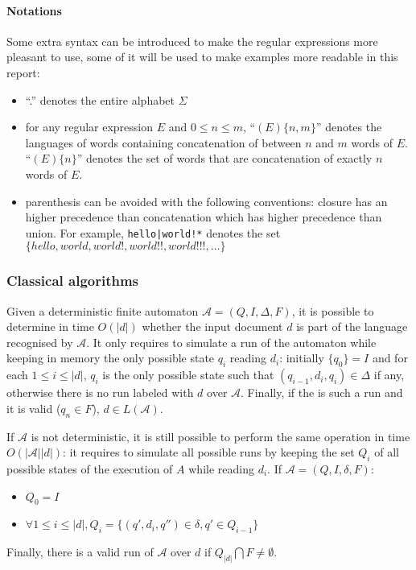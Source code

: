 \documentclass[12px]{article}
\begin{document}
        \paragraph{Notations} Some extra syntax can be introduced to make the
        regular expressions more pleasant to use, some of it will be used to
        make examples more readable in this report:
        \begin{itemize}
          \item ``.'' denotes the entire alphabet $\Sigma$
          \item for any regular expression $E$ and $0 \leq n \leq m$,
            ``$(E)\{n,m\}$'' denotes the languages of words containing
            concatenation of between $n$ and $m$ words of $E$. ``$(E)\{n\}$''
            denotes the set of words that are concatenation of exactly $n$
            words of $E$.
          \item parenthesis can be avoided with the following conventions:
            closure has an higher precedence than concatenation which has
            higher precedence than union. For example, \texttt{hello|world!*}
            denotes the set $\{hello, world, world!, world!!, world!!!,
            \ldots\}$
        \end{itemize}

      \subsubsection{Classical algorithms}

        Given a deterministic finite automaton $\mathcal{A} = (Q, I, \Delta,
        F)$, it is possible to determine in time $O(|d|)$ whether the input
        document $d$ is part of the language recognised by $\mathcal{A}$. It
        only requires to simulate a run of the automaton while keeping in
        memory the only possible state $q_i$ reading $d_i$: initially $\{q_0\}
        = I$ and for each $1 \leq i \leq |d|$, $q_{i}$ is the only possible
        state such that $(q_{i-1}, d_i, q_i) \in \Delta$ if any, otherwise
        there is no run labeled with $d$ over $\mathcal{A}$. Finally, if the is
        such a run and it is valid ($q_n \in F$), $d \in L(\mathcal{A})$.

        If $\mathcal{A}$ is not deterministic, it is still possible to perform
        the same operation in time $O(|\mathcal{A}| |d|)$: it requires to
        simulate all possible runs by keeping the set $Q_i$ of all possible
        states of the execution of $A$ while reading $d_i$. If $\mathcal{A} =
        (Q, I, \delta, F)$:
        \begin{itemize}
          \item $Q_0 = I$
          \item $\forall 1 \leq i \leq |d|, Q_i = \{(q', d_i, q'') \in \delta,
            q' \in Q_{i-1}\}$
        \end{itemize}
        Finally, there is a valid run of $\mathcal{A}$ over $d$ if $Q_{|d|}
        \bigcap F \neq \emptyset$.
\end{document}
